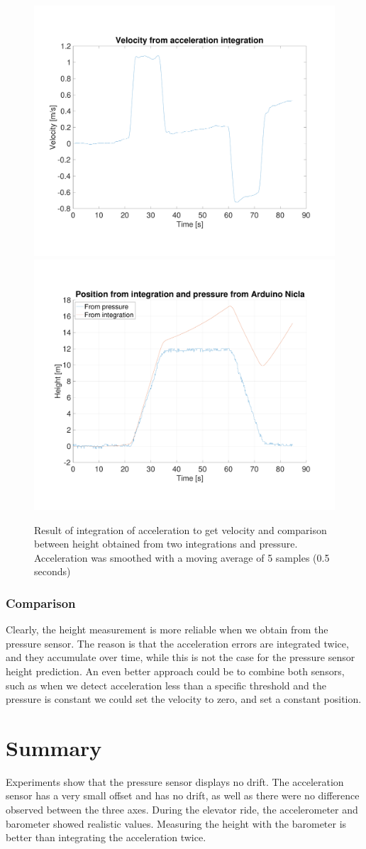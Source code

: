 \documentclass[DIV=14]{scrartcl}
\begin{document}
    \begin{figure}[h]
        \centering
        \includegraphics[width=.5\textwidth]{plots/plotElevatorVelocity}\hfill
        \includegraphics[width=.5\textwidth]{plots/plotElevatorPositionFromIntegrationAndPressure}\hfill
        \caption{Result of integration of acceleration to get velocity and comparison between height obtained from
        two integrations and pressure. Acceleration was smoothed with a moving average of 5 samples (0.5 seconds)}
        \label{fig:plotElevatorVelocityAndPosition}
    \end{figure}

    \subsubsection*{Comparison}
    Clearly, the height measurement is more reliable when we obtain from the pressure sensor.
    The reason is that the acceleration errors are integrated twice, and they accumulate over time, while this is not the
    case for the pressure sensor height prediction.
    An even better approach could be to combine both sensors, such as when we detect acceleration less than a specific
    threshold and the pressure is constant we could set the velocity to zero, and set a constant position.

    \section{Summary}
    Experiments show that the pressure sensor displays no drift.
    The acceleration sensor has a very small offset and has no drift, as well as there were no difference observed
    between the three axes.
    During the elevator ride, the accelerometer and barometer showed realistic values.
    Measuring the height with the barometer is better than integrating the acceleration twice.
\end{document}
